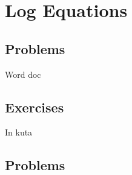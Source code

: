 \newpage
\section{Log Equations}
\subsection{Problems}
Word doc
\newpage

\newpage
\subsection{Exercises}
In kuta


\newpage
{}
\subsection{Problems}
\noindent{}
\newpage

\newpage
